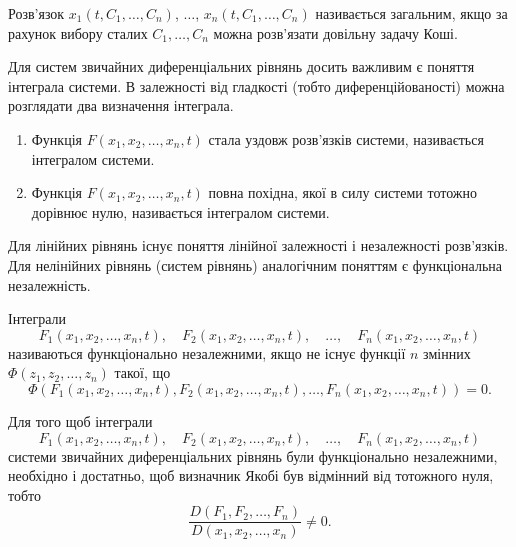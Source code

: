 \begin{definition}
	Розв'язок $x_1(t, C_1, \ldots, C_n)$, $\ldots$, $x_n(t, C_1, \ldots, C_n)$ на\-зи\-ва\-є\-ть\-ся загальним, якщо за рахунок вибору сталих $C_1, \ldots, C_n$ можна роз\-в'яз\-а\-ти довільну задачу Коші.
\end{definition}

Для систем звичайних диференціальних рівнянь досить важливим є поняття інтеграла системи. В залежності від гладкості (тобто диференційованості) можна розглядати два визначення інтеграла.

\begin{definition}
	\begin{enumerate}
		\item Функція $F(x_1, x_2, \ldots, x_n, t)$ стала уздовж розв'язків системи, називається інтегралом системи.
		\item Функція $F(x_1, x_2, \ldots, x_n, t)$ повна похідна, якої в силу системи тотожно дорівнює нулю, називається інтегралом системи.
	\end{enumerate}
\end{definition}

Для лінійних рівнянь існує поняття лінійної залежності і незалежності розв'язків. Для нелінійних рівнянь (систем рівнянь) аналогічним поняттям є функціональна незалежність.

\begin{definition}
	Інтеграли 
	\begin{equation*}
		F_1(x_1, x_2, \ldots, x_n, t), \quad F_2(x_1, x_2, \ldots, x_n, t), \quad \ldots, \quad F_n(x_1, x_2, \ldots, x_n, t)
	\end{equation*}
	називаються функціонально незалежними, якщо не існує функції $n$ змінних $\Phi(z_1, z_2, \ldots, z_n)$ такої, що
	\begin{equation*}
		\Phi(F_1(x_1, x_2, \ldots, x_n, t), F_2(x_1, x_2, \ldots, x_n, t), \ldots, F_n(x_1, x_2, \ldots, x_n, t)) = 0.
	\end{equation*}
\end{definition}

\begin{theorem}
	Для того щоб інтеграли 
	\begin{equation*}
		F_1(x_1, x_2, \ldots, x_n, t), \quad F_2(x_1, x_2, \ldots, x_n, t), \quad \ldots, \quad F_n(x_1, x_2, \ldots, x_n, t)
	\end{equation*}
	системи звичайних диференціальних рівнянь були функціонально незалежними, необхідно і достатньо, щоб визначник Якобі був відмінний від тотожного нуля, тобто 
	\begin{equation*}
		\frac{D(F_1, F_2, \ldots, F_n)}{D(x_1, x_2, \ldots, x_n)} \ne 0.
	\end{equation*}
\end{theorem}

